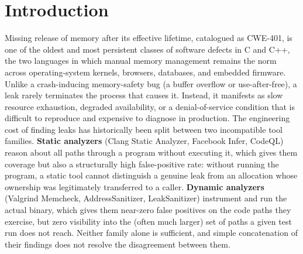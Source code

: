 \documentclass[11pt,a4paper]{article}
\begin{document}
\begin{abstract}
family (F1 ranges from 0.991 on \texttt{malloc} to 0.584 on \texttt{strdup}
sites), a swing that a family-balanced sub-sample would average away. On
seven real-world C projects from the peer-reviewed LAMeD benchmark (50
scoreable sites), the deterministic (\texttt{no\_llm}) configuration
achieves 100\% precision at 30.0\% recall, matched exactly by a separately
measured \texttt{llm\_assisted} configuration (mean of 3 independent runs).
Adding \texttt{interproceduralFlow} makes no measurable difference on this
benchmark, a path-sensitivity gap in its own alloc/free counting
(Section~\ref{sec:eval-lamed}). On a second, independently reconstructed
real-project corpus (19 cases across 6 of the MemHint paper's target
projects, 26 scoreable sites), both configurations converge again: 100\%
precision at 46.2\% recall, with the LLM judge flipping no verdict across
three independent runs (Section~\ref{sec:eval-memhint}). We report all of
this with explicit caveats where the evidence is incomplete or
inconclusive, so the contribution stays reproducible and falsifiable.
\end{abstract}

\section{Introduction}
\label{sec:intro}

Missing release of memory after its effective lifetime, catalogued as
CWE-401, is one of the oldest and most persistent classes of software defects in C and
C++, the two languages in which manual memory management remains the norm
across operating-system kernels, browsers, databases, and embedded
firmware. Unlike a crash-inducing memory-safety bug (a buffer overflow or
use-after-free), a leak rarely terminates the process that causes it.
Instead, it manifests as slow resource exhaustion, degraded availability, or a
denial-of-service condition that is difficult to reproduce and expensive to
diagnose in production. The engineering cost of finding leaks has
historically been split between two incompatible tool families.
\textbf{Static analyzers} (Clang Static Analyzer, Facebook Infer, CodeQL)
reason about all paths through a program without executing it, which gives
them coverage but also a structurally high false-positive rate: without
running the program, a static tool cannot distinguish a genuine leak from
an allocation whose ownership was legitimately transferred to a caller.
\textbf{Dynamic analyzers} (Valgrind Memcheck, AddressSanitizer,
LeakSanitizer) instrument and run the actual binary, which gives them
near-zero false positives on the code paths they exercise, but zero
visibility into the (often much larger) set of paths a given test run does
not reach. Neither family alone is sufficient, and simple concatenation of
their findings does not resolve the disagreement between them.
\end{document}

